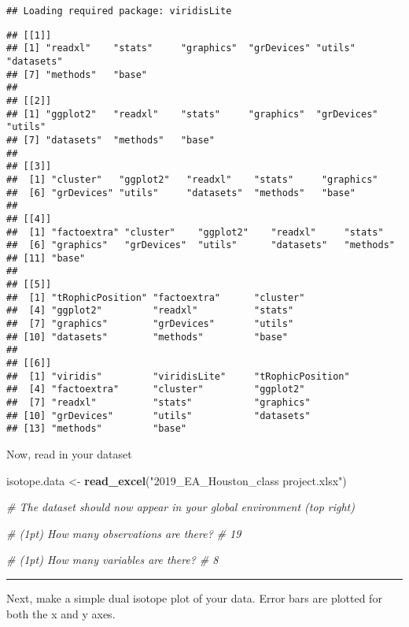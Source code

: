 \documentclass[]{article}
\newenvironment{Shaded}{\begin{snugshade}}{\end{snugshade}}
\newcommand{\KeywordTok}[1]{\textcolor[rgb]{0.13,0.29,0.53}{\textbf{#1}}}
\newcommand{\StringTok}[1]{\textcolor[rgb]{0.31,0.60,0.02}{#1}}
\newcommand{\CommentTok}[1]{\textcolor[rgb]{0.56,0.35,0.01}{\textit{#1}}}
\newcommand{\NormalTok}[1]{#1}
\begin{document}
\begin{verbatim}
## Loading required package: viridisLite
\end{verbatim}

\begin{verbatim}
## [[1]]
## [1] "readxl"    "stats"     "graphics"  "grDevices" "utils"     "datasets" 
## [7] "methods"   "base"     
## 
## [[2]]
## [1] "ggplot2"   "readxl"    "stats"     "graphics"  "grDevices" "utils"    
## [7] "datasets"  "methods"   "base"     
## 
## [[3]]
##  [1] "cluster"   "ggplot2"   "readxl"    "stats"     "graphics" 
##  [6] "grDevices" "utils"     "datasets"  "methods"   "base"     
## 
## [[4]]
##  [1] "factoextra" "cluster"    "ggplot2"    "readxl"     "stats"     
##  [6] "graphics"   "grDevices"  "utils"      "datasets"   "methods"   
## [11] "base"      
## 
## [[5]]
##  [1] "tRophicPosition" "factoextra"      "cluster"        
##  [4] "ggplot2"         "readxl"          "stats"          
##  [7] "graphics"        "grDevices"       "utils"          
## [10] "datasets"        "methods"         "base"           
## 
## [[6]]
##  [1] "viridis"         "viridisLite"     "tRophicPosition"
##  [4] "factoextra"      "cluster"         "ggplot2"        
##  [7] "readxl"          "stats"           "graphics"       
## [10] "grDevices"       "utils"           "datasets"       
## [13] "methods"         "base"
\end{verbatim}

Now, read in your dataset

\begin{Shaded}
\begin{Highlighting}[]
\NormalTok{isotope.data <-}\StringTok{ }\KeywordTok{read_excel}\NormalTok{(}\StringTok{"2019_EA_Houston_class project.xlsx"}\NormalTok{)}

\CommentTok{# The dataset should now appear in your global environment (top right)}

\CommentTok{# (1pt) How many observations are there?}
\CommentTok{# 19}

\CommentTok{# (1pt) How many variables are there?}
\CommentTok{# 8}
\end{Highlighting}
\end{Shaded}

\begin{center}\rule{0.5\linewidth}{\linethickness}\end{center}

Next, make a simple dual isotope plot of your data. Error bars are
plotted for both the x and y axes.
\end{document}
